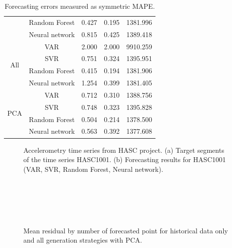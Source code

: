 \documentclass[conference]{IEEEtran}
\begin{document}
\begin{table}
\begin{tabular}{|c|c|c|c|c|}
\cline{2-5}
 &Random Forest &   0.427 &    0.195 &    1381.996\\
\cline{2-5}
 &Neural network &   0.815 &    0.425 &    1389.418\\
\cline{2-5}
\hline
\multirow{4}{*}{All} &VAR &   2.000 &    2.000 &    9910.259\\
\cline{2-5}
 &SVR &   0.751 &    0.324 &    1395.951\\
\cline{2-5}
 &Random Forest &   0.415 &    0.194 &    1381.906\\
\cline{2-5}
 &Neural network &   1.254 &    0.399 &    1381.405\\
\cline{2-5}
\hline
\multirow{4}{*}{PCA} &VAR &   0.712 &    0.310 &    1388.756\\
\cline{2-5}
 &SVR &   0.748 &    0.323 &    1395.828\\
\cline{2-5}
 &Random Forest &   0.504 &    0.214 &    1378.500\\
\cline{2-5}
 &Neural network &   0.563 &    0.392 &    1377.608\\
\cline{2-5}
\hline
\end{tabular}
\caption{Forecasting errors measured as symmetric MAPE.}
\label{fg:feature_selection_res_HASC1}
\end{table}


\begin{figure}
\centering
\caption{Accelerometry time series from HASC project.
(a) Target segments of the time series HASC1001. (b) Forecasting results for	HASC1001 (VAR, SVR, Random Forest, Neural network).}\label{fg:target_data}
\end{figure}


\begin{figure}
\centering
{}
 \\
\\
 \\
\\
\caption{Mean residual by number of forecasted point for historical data only and all generation strategies with PCA.}
\end{figure}
\end{document}
